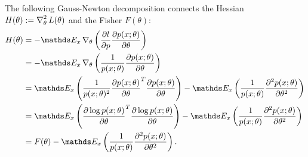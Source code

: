 \documentclass{article}
\begin{document}
The following Gauss-Newton decomposition connects the Hessian $H(\theta):=\operatorname{\nabla}_{\theta}^2L(\theta)$
and the Fisher $F(\theta)$:
\begin{equation*}
\begin{aligned}
    H(\theta) &= -\Ebb_x\grad_{\theta} \left( \frac{\partial l}{\partial p}\frac{\partial p(x;\theta)}{\partial \theta} \right)\\
    &= -\Ebb_x\grad_{\theta} \left( \frac{1}{p(x;\theta)}\frac{\partial p(x;\theta)}{\partial \theta} \right)\\
    &= \Ebb_x \left(\frac{1}{p(x;\theta)^2}\frac{\partial p(x;\theta)}{\partial \theta}^T\frac{\partial p(x;\theta)}{\partial \theta}\right) - \Ebb_x\left(\frac{1}{p(x;\theta)}\frac{\partial^2 p(x;\theta)}{\partial \theta^2}\right)\\
    &= \Ebb_x \left(\frac{\partial \log p(x;\theta)}{\partial \theta}^T\frac{\partial \log p(x;\theta)}{\partial \theta}\right) - \Ebb_x\left(\frac{1}{p(x;\theta)}\frac{\partial^2 p(x;\theta)}{\partial \theta^2}\right)\\
    &=F(\theta)  - \Ebb_x\left(\frac{1}{p(x;\theta)}\frac{\partial^2 p(x;\theta)}{\partial \theta^2}\right).
\end{aligned}
\end{equation*}




\end{document}
